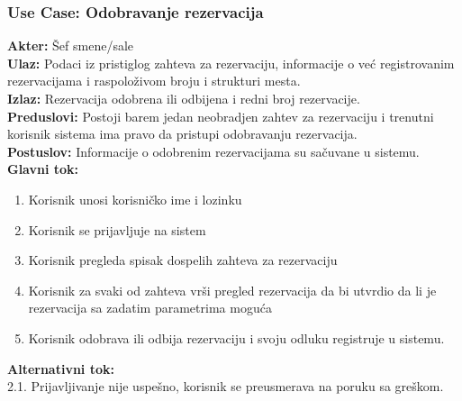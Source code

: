 \documentclass{article}
\begin{document}
\subsubsection{\textbf{Use Case}:  Odobravanje rezervacija}
\textbf{Akter:} Šef smene/sale\\
\textbf{Ulaz:} Podaci iz pristiglog zahteva za rezervaciju, informacije o već registrovanim rezervacijama i raspoloživom broju i strukturi mesta.\\
\textbf{Izlaz:} Rezervacija odobrena ili odbijena i redni broj rezervacije.\\
\textbf{Preduslovi:} Postoji barem jedan neobradjen zahtev za rezervaciju i trenutni korisnik sistema ima pravo da pristupi odobravanju rezervacija.\\
\textbf{Postuslov:} Informacije o odobrenim rezervacijama su sačuvane u sistemu.\\
\textbf{Glavni tok:}
\begin{enumerate}
\item Korisnik unosi korisničko ime i lozinku
\item Korisnik se prijavljuje na sistem
\item Korisnik pregleda spisak dospelih zahteva za rezervaciju
\item Korisnik za svaki od zahteva vrši pregled rezervacija da bi utvrdio da li je rezervacija sa zadatim parametrima moguća
\item Korisnik odobrava ili odbija rezervaciju i svoju odluku registruje u sistemu.\\
\end{enumerate}
\textbf{Alternativni tok:}\\
       2.1. Prijavljivanje nije uspešno, korisnik se preusmerava na poruku sa greškom.\\
\end{document}
